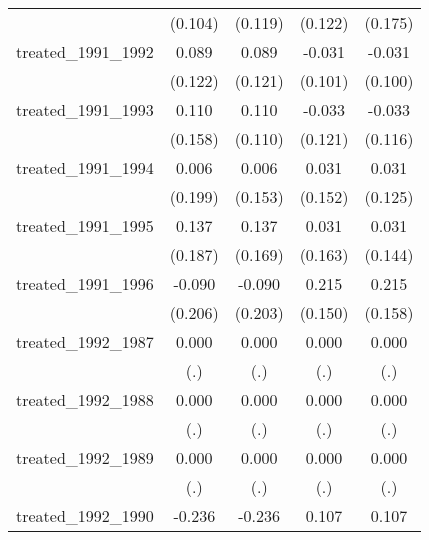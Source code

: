 {\begin{tabular}{l*{4}{c}}
            &     (0.104)         &     (0.119)         &     (0.122)         &     (0.175)         \\
[1em]
treated\_1991\_1992&       0.089         &       0.089         &      -0.031         &      -0.031         \\
            &     (0.122)         &     (0.121)         &     (0.101)         &     (0.100)         \\
[1em]
treated\_1991\_1993&       0.110         &       0.110         &      -0.033         &      -0.033         \\
            &     (0.158)         &     (0.110)         &     (0.121)         &     (0.116)         \\
[1em]
treated\_1991\_1994&       0.006         &       0.006         &       0.031         &       0.031         \\
            &     (0.199)         &     (0.153)         &     (0.152)         &     (0.125)         \\
[1em]
treated\_1991\_1995&       0.137         &       0.137         &       0.031         &       0.031         \\
            &     (0.187)         &     (0.169)         &     (0.163)         &     (0.144)         \\
[1em]
treated\_1991\_1996&      -0.090         &      -0.090         &       0.215         &       0.215         \\
            &     (0.206)         &     (0.203)         &     (0.150)         &     (0.158)         \\
[1em]
treated\_1992\_1987&       0.000         &       0.000         &       0.000         &       0.000         \\
            &         (.)         &         (.)         &         (.)         &         (.)         \\
[1em]
treated\_1992\_1988&       0.000         &       0.000         &       0.000         &       0.000         \\
            &         (.)         &         (.)         &         (.)         &         (.)         \\
[1em]
treated\_1992\_1989&       0.000         &       0.000         &       0.000         &       0.000         \\
            &         (.)         &         (.)         &         (.)         &         (.)         \\
[1em]
treated\_1992\_1990&      -0.236         &      -0.236         &       0.107         &       0.107         \\

\end{tabular}}
